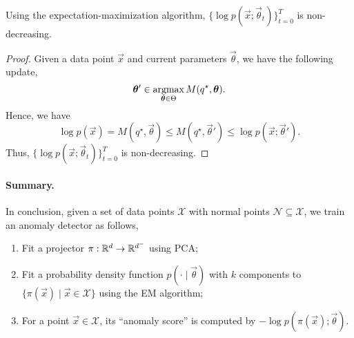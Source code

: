 \begin{theorem}
    Using the expectation-maximization algorithm, $\{ \log p(\vec{x}; \vec{\theta}_t) \}_{t=0}^T$ is non-decreasing.
\end{theorem}

\begin{proof}
    Given a data point $\vec{x}$ and current parameters $\vec{\theta}$, we have the following update, \[
        \bm{\theta}' \in \operatorname*{argmax}_{\bm{\theta} \in \Theta} M(q^\star, \bm{\theta}).
    \]
    Hence, we have \[
        \log p(\vec{x}) = M(q^\star, \vec{\theta}) \leq M(q^\star, \vec{\theta}') \leq \log p(\vec{x}; \vec{\theta}').
    \]
    Thus, $\{ \log p(\vec{x}; \vec{\theta}_t) \}_{t=0}^T$ is non-decreasing.
\end{proof}

\paragraph{Summary.}

In conclusion, given a set of data points $\mathcal{X}$ with normal points $\mathcal{N} \subseteq
    \mathcal{X}$, we train an anomaly detector as follows,
\begin{enumerate}
    \item Fit a projector $\pi: \mathbb{R}^d \to \mathbb{R}^{d^-}$ using PCA;
    \item Fit a probability density function $p(\cdot \mid \vec{\theta})$ with $k$ components to $\{
              \pi(\vec{x}) \mid \vec{x} \in \mathcal{X} \}$ using the EM algorithm;
    \item For a point $\vec{x} \in \mathcal{X}$, its ``anomaly score'' is computed by $-\log p(\pi(\vec{x});
              \vec{\theta})$.
\end{enumerate}
